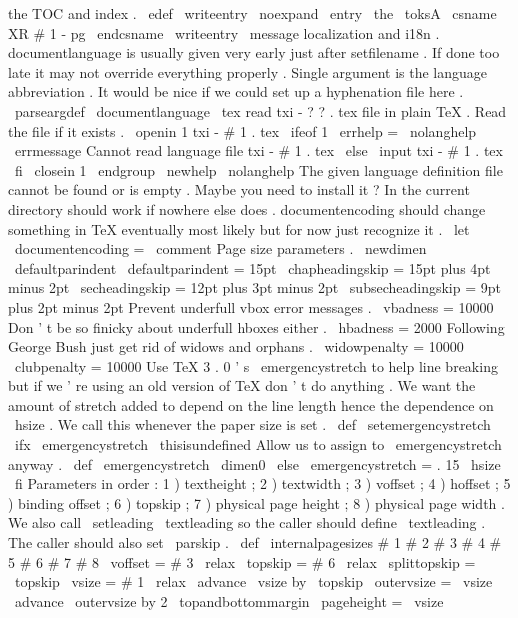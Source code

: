 {{{{the
TOC
and
index
.
\
edef
\
writeentry
{
\
noexpand
\
entry
{
\
the
\
toksA
}
{
\
csname
XR
#
1
-
pg
\
endcsname
}
}
%
\
writeentry
}
}
\
message
{
localization
}
%
and
i18n
.
%
documentlanguage
is
usually
given
very
early
just
after
%
setfilename
.
If
done
too
late
it
may
not
override
everything
%
properly
.
Single
argument
is
the
language
abbreviation
.
%
It
would
be
nice
if
we
could
set
up
a
hyphenation
file
here
.
%
\
parseargdef
\
documentlanguage
{
%
\
tex
%
read
txi
-
?
?
.
tex
file
in
plain
TeX
.
%
Read
the
file
if
it
exists
.
\
openin
1
txi
-
#
1
.
tex
\
ifeof
1
\
errhelp
=
\
nolanghelp
\
errmessage
{
Cannot
read
language
file
txi
-
#
1
.
tex
}
%
\
else
\
input
txi
-
#
1
.
tex
\
fi
\
closein
1
\
endgroup
}
\
newhelp
\
nolanghelp
{
The
given
language
definition
file
cannot
be
found
or
is
empty
.
Maybe
you
need
to
install
it
?
In
the
current
directory
should
work
if
nowhere
else
does
.
}
%
documentencoding
should
change
something
in
TeX
eventually
most
%
likely
but
for
now
just
recognize
it
.
\
let
\
documentencoding
=
\
comment
%
Page
size
parameters
.
%
\
newdimen
\
defaultparindent
\
defaultparindent
=
15pt
\
chapheadingskip
=
15pt
plus
4pt
minus
2pt
\
secheadingskip
=
12pt
plus
3pt
minus
2pt
\
subsecheadingskip
=
9pt
plus
2pt
minus
2pt
%
Prevent
underfull
vbox
error
messages
.
\
vbadness
=
10000
%
Don
'
t
be
so
finicky
about
underfull
hboxes
either
.
\
hbadness
=
2000
%
Following
George
Bush
just
get
rid
of
widows
and
orphans
.
\
widowpenalty
=
10000
\
clubpenalty
=
10000
%
Use
TeX
3
.
0
'
s
\
emergencystretch
to
help
line
breaking
but
if
we
'
re
%
using
an
old
version
of
TeX
don
'
t
do
anything
.
We
want
the
amount
of
%
stretch
added
to
depend
on
the
line
length
hence
the
dependence
on
%
\
hsize
.
We
call
this
whenever
the
paper
size
is
set
.
%
\
def
\
setemergencystretch
{
%
\
ifx
\
emergencystretch
\
thisisundefined
%
Allow
us
to
assign
to
\
emergencystretch
anyway
.
\
def
\
emergencystretch
{
\
dimen0
}
%
\
else
\
emergencystretch
=
.
15
\
hsize
\
fi
}
%
Parameters
in
order
:
1
)
textheight
;
2
)
textwidth
;
%
3
)
voffset
;
4
)
hoffset
;
5
)
binding
offset
;
6
)
topskip
;
%
7
)
physical
page
height
;
8
)
physical
page
width
.
%
%
We
also
call
\
setleading
{
\
textleading
}
so
the
caller
should
define
%
\
textleading
.
The
caller
should
also
set
\
parskip
.
%
\
def
\
internalpagesizes
#
1
#
2
#
3
#
4
#
5
#
6
#
7
#
8
{
%
\
voffset
=
#
3
\
relax
\
topskip
=
#
6
\
relax
\
splittopskip
=
\
topskip
%
\
vsize
=
#
1
\
relax
\
advance
\
vsize
by
\
topskip
\
outervsize
=
\
vsize
\
advance
\
outervsize
by
2
\
topandbottommargin
\
pageheight
=
\
vsize
}}}
